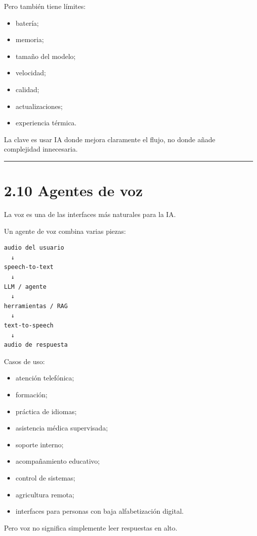 Pero también tiene límites:

\begin{itemize}
\tightlist
\item
  batería;
\item
  memoria;
\item
  tamaño del modelo;
\item
  velocidad;
\item
  calidad;
\item
  actualizaciones;
\item
  experiencia térmica.
\end{itemize}

La clave es usar IA donde mejora claramente el flujo, no donde añade
complejidad innecesaria.

\begin{center}\rule{0.5\linewidth}{0.5pt}\end{center}

\section{2.10 Agentes de voz}\label{agentes-de-voz}

La voz es una de las interfaces más naturales para la IA.

Un agente de voz combina varias piezas:

\begin{lstlisting}
audio del usuario
  ↓
speech-to-text
  ↓
LLM / agente
  ↓
herramientas / RAG
  ↓
text-to-speech
  ↓
audio de respuesta
\end{lstlisting}

Casos de uso:

\begin{itemize}
\tightlist
\item
  atención telefónica;
\item
  formación;
\item
  práctica de idiomas;
\item
  asistencia médica supervisada;
\item
  soporte interno;
\item
  acompañamiento educativo;
\item
  control de sistemas;
\item
  agricultura remota;
\item
  interfaces para personas con baja alfabetización digital.
\end{itemize}

Pero voz no significa simplemente leer respuestas en alto.

